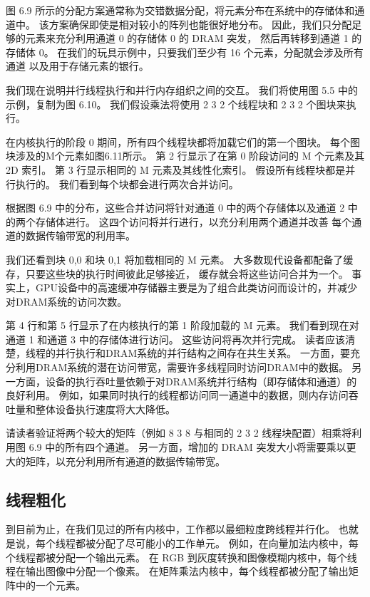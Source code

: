 图 6.9 所示的分配方案通常称为交错数据分配，将元素分布在系统中的存储体和通道中。 
该方案确保即使是相对较小的阵列也能很好地分布。 因此，我们只分配足够的元素来充分利用通道 0 的存储体 0 的 DRAM 突发，
然后再转移到通道 1 的存储体 0。
在我们的玩具示例中，只要我们至少有 16 个元素，分配就会涉及所有通道 以及用于存储元素的银行。

我们现在说明并行线程执行和并行内存组织之间的交互。 我们将使用图 5.5 中的示例，复制为图 6.10。 
我们假设乘法将使用 2 3 2 个线程块和 2 3 2 个图块来执行。

在内核执行的阶段 0 期间，所有四个线程块都将加载它们的第一个图块。 每个图块涉及的M个元素如图6.11所示。 
第 2 行显示了在第 0 阶段访问的 M 个元素及其 2D 索引。 第 3 行显示相同的 M 元素及其线性化索引。 
假设所有线程块都是并行执行的。 我们看到每个块都会进行两次合并访问。

根据图 6.9 中的分布，这些合并访问将针对通道 0 中的两个存储体以及通道 2 中的两个存储体进行。
这四个访问将并行进行，以充分利用两个通道并改善 每个通道的数据传输带宽的利用率。

我们还看到块 0,0 和块 0,1 将加载相同的 M 元素。 大多数现代设备都配备了缓存，只要这些块的执行时间彼此足够接近，
缓存就会将这些访问合并为一个。 
事实上，GPU设备中的高速缓冲存储器主要是为了组合此类访问而设计的，并减少对DRAM系统的访问次数。

第 4 行和第 5 行显示了在内核执行的第 1 阶段加载的 M 元素。 我们看到现在对通道 1 和通道 3 中的存储体进行访问。
这些访问将再次并行完成。 读者应该清楚，线程的并行执行和DRAM系统的并行结构之间存在共生关系。 
一方面，要充分利用DRAM系统的潜在访问带宽，需要许多线程同时访问DRAM中的数据。 
另一方面，设备的执行吞吐量依赖于对DRAM系统并行结构（即存储体和通道）的良好利用。 
例如，如果同时执行的线程都访问同一通道中的数据，则内存访问吞吐量和整体设备执行速度将大大降低。

请读者验证将两个较大的矩阵（例如 8 3 8 与相同的 2 3 2 线程块配置）相乘将利用图 6.9 中的所有四个通道。 
另一方面，增加的 DRAM 突发大小将需要乘以更大的矩阵，以充分利用所有通道的数据传输带宽。

\subsection{线程粗化}
到目前为止，在我们见过的所有内核中，工作都以最细粒度跨线程并行化。 也就是说，每个线程都被分配了尽可能小的工作单元。 
例如，在向量加法内核中，每个线程都被分配一个输出元素。 
在 RGB 到灰度转换和图像模糊内核中，每个线程在输出图像中分配一个像素。 
在矩阵乘法内核中，每个线程都被分配了输出矩阵中的一个元素。

